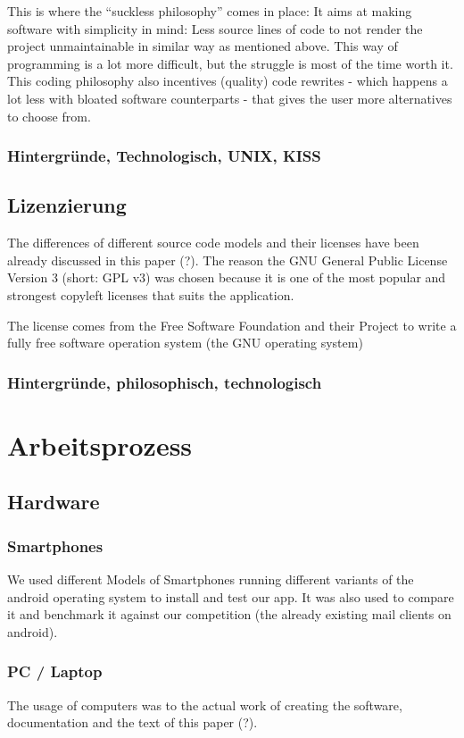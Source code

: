 \documentclass[a4paper,11pt]{article}
\begin{document}
This is where the ``suckless philosophy'' comes in place: It aims at making software with simplicity in mind: Less source lines of code to not render the project unmaintainable in similar way as mentioned above. This way of programming is a lot more difficult, but the struggle is most of the time worth it. This coding philosophy also incentives (quality) code rewrites - which happens a lot less with bloated software counterparts - that gives the user more alternatives to choose from.

\subsubsection{Hintergründe, Technologisch, UNIX, KISS}
\subsection{Lizenzierung}
The differences of different source code models and their licenses have been already discussed in this paper (?). The reason the GNU General Public License Version 3 (short: GPL v3) was chosen because it is one of the most popular and strongest copyleft licenses that suits the application.

The license comes from the Free Software Foundation and their Project to write a fully free software operation system (the GNU operating system)

\subsubsection{Hintergründe, philosophisch, technologisch}

\section{Arbeitsprozess}

\subsection{Hardware}

\subsubsection{Smartphones}
We used different Models of Smartphones running different variants of the android operating system to install and test our app. It was also used to compare it and benchmark it against our competition (the already existing mail clients on android).
\subsubsection{PC / Laptop}
The usage of computers was to the actual work of creating the software, documentation and the text of this paper (?).
\end{document}
